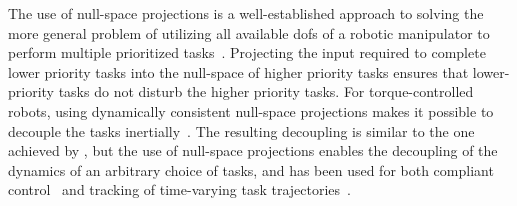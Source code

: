 \documentclass[../main.tex]{subfiles}
\begin{document}

The use of null-space projections is a well-established approach to solving the more general problem of utilizing all available \glspl{dof} of a robotic manipulator to perform multiple prioritized tasks~\citep{Khatib1987}. Projecting the input required to complete lower priority tasks into the null-space of higher priority tasks ensures that lower-priority tasks do not disturb the higher priority tasks. %
For torque-controlled robots, using dynamically consistent null-space projections makes it possible to decouple the tasks inertially~\citep{Ott2015}. %
The resulting decoupling is similar to the one achieved by \cite{Garofalo2015}, but the use of null-space projections enables the decoupling of the dynamics of an arbitrary choice of tasks, and has been used for both compliant control~\citep{Ott2015} and tracking of time-varying task trajectories~\citep{Dietrich2020,Saeboe2022}.



\end{document}
